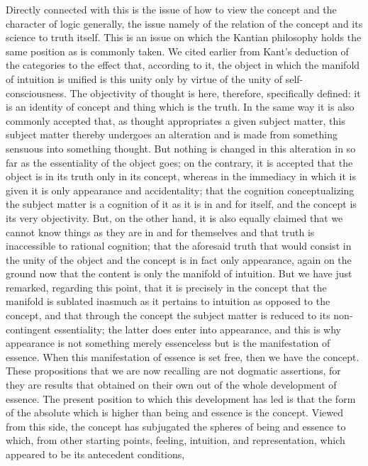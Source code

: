 Directly connected with this is
the issue of how to view the concept
and the character of logic generally,
the issue namely of the relation of
the concept and its science to truth itself.
This is an issue on which the Kantian philosophy
holds the same position as is commonly taken.
We cited earlier from Kant's deduction of the categories
to the effect that, according to it,
the object in which the manifold of intuition is unified is
this unity only by virtue of the unity of self-consciousness.
The objectivity of thought is here, therefore, specifically defined:
it is an identity of concept and thing which is the truth.
In the same way it is also commonly accepted that,
as thought appropriates a given subject matter,
this subject matter thereby undergoes an alteration
and is made from something sensuous into something thought.
But nothing is changed in this alteration
in so far as the essentiality of the object goes;
on the contrary, it is accepted that the object is
in its truth only in its concept,
whereas in the immediacy in
which it is given it is only appearance and accidentality;
that the cognition conceptualizing the subject matter is
a cognition of it as it is in and for itself,
and the concept is its very objectivity.
But, on the other hand, it is also equally claimed
that we cannot know things as they are in and for themselves
and that truth is inaccessible to rational cognition;
that the aforesaid truth that would consist
in the unity of the object
and the concept is in fact only appearance,
again on the ground now that the content is
only the manifold of intuition.
But we have just remarked, regarding this point,
that it is precisely in the concept
that the manifold is sublated inasmuch
as it pertains to intuition as opposed to the concept,
and that through the concept the subject matter is
reduced to its non-contingent essentiality;
the latter does enter into appearance,
and this is why appearance is not
something merely essenceless
but is the manifestation of essence.
When this manifestation of essence is set free,
then we have the concept.
These propositions that we are now recalling
are not dogmatic assertions,
for they are results that obtained on their own
out of the whole development of essence.
The present position to which this development has led
is that the form of the absolute
which is higher than being and essence is the concept.
Viewed from this side, the concept has subjugated
the spheres of being and essence to which,
from other starting points,
feeling, intuition, and representation,
which appeared to be its antecedent conditions,
